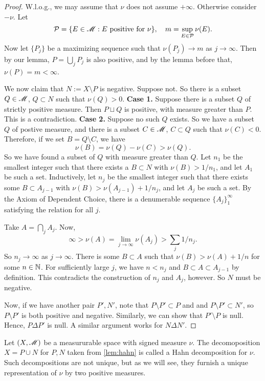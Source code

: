 \documentclass[12pt]{article} %
\begin{document}
\begin{proof}
    W.l.o.g., we may assume that $\nu$ does not assume $+\infty$. Otherwise consider $-\nu$. Let \[\mathcal{P} = \{E \in \mathscr{M} : E \ \text{positive for} \ \nu\}, \ \ \ m = \sup_{E \in \mathcal{P}} \nu(E).\] Now let $\{P_j\}$ be a maximizing sequence such that $\nu(P_j) \to m$ as $j \to \infty$. Then by our lemma, $P = \bigcup_j P_j$ is also positive, and by the lemma before that, $\nu(P) = m < \infty$.

    We now claim that $N := X \setminus P$ is negative. Suppose not. So there is a subset $Q \in \mathscr{M}$, $Q \subset N$ such that $\nu(Q) > 0$. \textbf{Case 1.} Suppose there is a subset $Q$ of strictly positive measure. Then $P \sqcup Q$ is positive, with measure greater than $P$. This is a contradiction. \textbf{Case 2.} Suppose no such $Q$ exists. So we have a subset $Q$ of postive measure, and there is a subset $C \in \mathscr{M}$, $C \subset Q$ such that $\nu(C) < 0$. Therefore, if we set $B = Q \setminus C$, we have \[\nu(B) = \nu(Q) - \nu(C) > \nu(Q).\] So we have found a subset of $Q$ with measure greater than $Q$. Let $n_1$ be the smallest integer such that there exists a $B \subset N$ with $\nu(B) > 
    1/n_1$, and let $A_1$ be such a set. Inductively, let $n_j$ be the smallest integer such that there exists some $B \subset A_{j-1}$ with $\nu(B) > \nu(A_{j-1}) + 1/n_j$, and let $A_j$ be such a set. By the Axiom of Dependent Choice, there is a denumerable sequence $\{A_j\}_1^\infty$ satisfying the relation for all $j$. 
    
    Take $A = \bigcap_j A_j$. Now, \[\infty > \nu(A) = \lim_{j \to \infty} \nu(A_j) > \sum_j 1/n_j.\] So $n_j \to \infty$ as $j \to \infty$. There is some $B \subset A$ such that $\nu(B) > \nu(A) + 1/n$ for some $n \in \mathbb{N}$. For sufficiently large $j$, we have $n < n_j$ and $B \subset A \subset A_{j-1}$ by definition. This contradicts the construction of $n_j$ and $A_j$, however. So $N$ must be negative.

    Now, if we have another pair $P', N'$, note that $P \setminus P' \subset P$ and and $P \setminus P' \subset N'$, so $P \setminus P'$ is both positive and negative. Similarly, we can show that $P' \setminus P$ is null. Hence, $P \Delta P'$ is null. A similar argument works for $N \Delta N'$.
\end{proof}

\begin{definition}
    Let $(X, \mathscr{M})$ be a measururable space with signed measure $\nu$.
    The decomoposition $X = P \cup N$ for $P, N$ taken from \cref{lem:hahn} is called a Hahn decomposition for $\nu$. Such decompositions are not unique, but as we will see, they furnish a unique representation of $\nu$ by two positive measures.
\end{definition}
\end{document}
